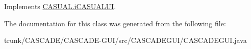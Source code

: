 Implements \hyperlink{interface_c_a_s_u_a_l_1_1i_c_a_s_u_a_l_u_i_a8dcf6547f0bf15b2fb7ac176d8e649c1}{C\-A\-S\-U\-A\-L.\-i\-C\-A\-S\-U\-A\-L\-U\-I}.



The documentation for this class was generated from the following file\-:\begin{DoxyCompactItemize}
\item 
trunk/\-C\-A\-S\-C\-A\-D\-E/\-C\-A\-S\-C\-A\-D\-E-\/\-G\-U\-I/src/\-C\-A\-S\-C\-A\-D\-E\-G\-U\-I/C\-A\-S\-C\-A\-D\-E\-G\-U\-I.\-java\end{DoxyCompactItemize}
